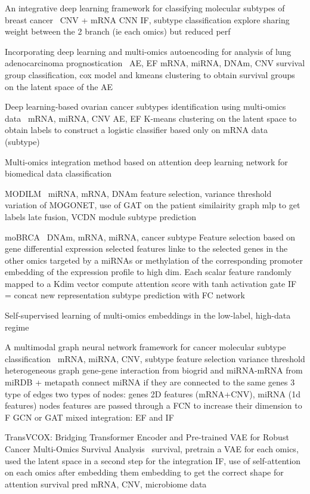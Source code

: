 \documentclass[../main.tex]{subfiles}
\begin{document}
An integrative deep learning framework for classifying molecular subtypes of breast cancer~\cite{MohaiminulIslam2020}
CNV + mRNA 
CNN IF, subtype classification
explore sharing weight between the 2 branch (ie each omics) but reduced perf 



Incorporating deep learning and multi-omics autoencoding for analysis of lung adenocarcinoma prognostication~\cite{Lee2020}
AE, EF 
mRNA, miRNA, DNAm, CNV 
survival group classification, cox model and kmeans clustering to obtain survival groups on the latent space of the AE

Deep learning-based ovarian cancer subtypes identification using multi-omics data~\cite{Guo2020}
mRNA, miRNA, CNV
AE, EF 
K-means clustering on the latent space to obtain labels to construct a logistic classifier based only on mRNA data (subtype)

Multi-omics integration method based on attention deep learning network for biomedical data classification

MODILM~\cite{MODILM}
miRNA, mRNA, DNAm
feature selection, variance threshold
variation of MOGONET, use of GAT on the patient similairity graph
mlp to get labels 
late fusion, VCDN module
subtype prediction 

moBRCA~\cite{moBRCA}
DNAm, mRNA, miRNA, cancer subtype
Feature selection based on gene differential expression 
selected features linke to the selected genes in the other omics 
targeted by a miRNAs or methylation of the corresponding promoter
embedding of the expression profile to high dim. Each scalar feature randomly mapped to a Kdim vector
compute attention score with tanh activation gate
IF = concat new representation 
subtype prediction with FC network

Self-supervised learning of multi-omics embeddings in the low-label, high-data regime

A multimodal graph neural network framework for cancer molecular subtype classification~\cite{Li2024}
mRNA, miRNA, CNV, subtype
feature selection variance threshold 
heterogeneous graph gene-gene interaction from biogrid and miRNA-mRNA from miRDB + metapath connect miRNA if they are connected to the same genes
3 type of edges 
two types of nodes: genes 2D features (mRNA+CNV), miRNA (1d features)
nodes features are passed through a FCN to increase their dimension to F 
GCN or GAT 
mixed integration: EF and IF 

TransVCOX: Bridging Transformer Encoder and Pre-trained VAE for Robust Cancer Multi-Omics Survival Analysis~\cite{10385668}
survival, pretrain a VAE for each omics, used the latent space in a second step for the integration 
IF, use of self-attention on each omics after embedding them embedding to get the correct shape for attention 
survival pred
mRNA, CNV, microbiome data 
\end{document}
